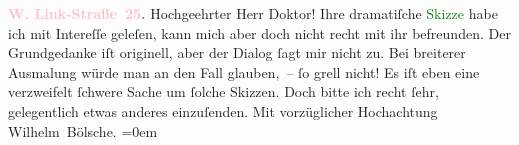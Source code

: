            \pstart
           \noindent{}\raggedleft{}\textcolor{gray}{\textbf{\textcolor{pink}{W. Link-Straße 25}{}\ledrightnote{\textcolor{pink}{Linkstraße}}.}}\pend
           \pstart\center{}Hochgeehrter Herr Doktor!\pend\pstart
           Ihre dramatiſche \textcolor{green}{Skizze}{} habe
                    ich mit Intereſſe geleſen, kann mich aber doch nicht recht mit ihr befreunden.
                    Der Grundgedanke iſt originell, aber der Dialog ſagt mir nicht zu. Bei breiterer
                    Ausmalung würde man an den Fall glauben, – ſo grell nicht! Es iſt eben eine
                    verzweifelt ſchwere Sache um ſolche Skizzen. Doch bitte ich recht ſehr,
                    gelegentlich etwas anderes einzuſenden.\pend
           \pstart
           Mit vorzüglicher Hochachtung{\\[\baselineskip]}\spacefill\mbox{Wilhelm Bölsche.}\pend
           \leftskip=0em{}\endnumbering{}  
      